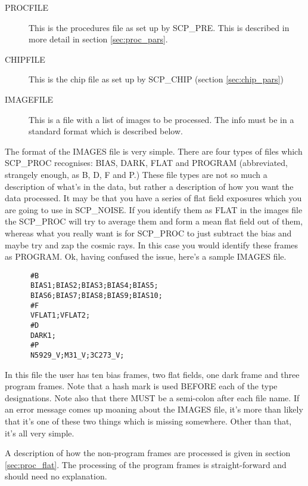 \begin{description}

\item [PROCFILE] This is the procedures file as set up by SCP\_PRE. This
is described in more detail in section \ref{sec:proc_pars}.

\item [CHIPFILE] This is the chip file as set up by SCP\_CHIP (section
\ref{sec:chip_pars})

\item [IMAGEFILE] This is a file with a list of images to be processed. The
info must be in a standard format which is described below.

\end{description}

The format of the IMAGES file is very simple.  There are four types of files
which SCP\_PROC recognises: BIAS, DARK, FLAT and PROGRAM (abbreviated,
strangely enough, as B, D, F and P.)  These file types are not so much a
description of what's in the data, but rather a description of how you want the
data processed.  It may be that you have a series of flat field exposures which
you are going to use in SCP\_NOISE. If you identify them as FLAT in the images
file the SCP\_PROC will try to average them and form a mean flat field out of
them, whereas what you really want is for SCP\_PROC to just subtract the bias
and maybe try and zap the cosmic rays.  In this case you would identify these
frames as PROGRAM.  Ok, having confused the issue, here's a sample IMAGES file.

\begin{verbatim}
      #B                               
      BIAS1;BIAS2;BIAS3;BIAS4;BIAS5;   
      BIAS6;BIAS7;BIAS8;BIAS9;BIAS10;  
      #F                               
      VFLAT1;VFLAT2;                   
      #D                               
      DARK1;                           
      #P                               
      N5929_V;M31_V;3C273_V;           
\end{verbatim}

In this file the user has ten bias frames, two flat fields, one dark frame and
three program frames.  Note that a hash mark is used BEFORE each of the type
designations. Note also that there MUST be a semi-colon after each file name. 
If an error message comes up moaning about the IMAGES file, it's more than
likely that it's one of these two things which is missing somewhere. Other than
that, it's all very simple.

A description of how the non-program frames are processed is given in section
\ref{sec:proc_flat}.  The processing of the program frames is straight-forward
and should need no explanation.

